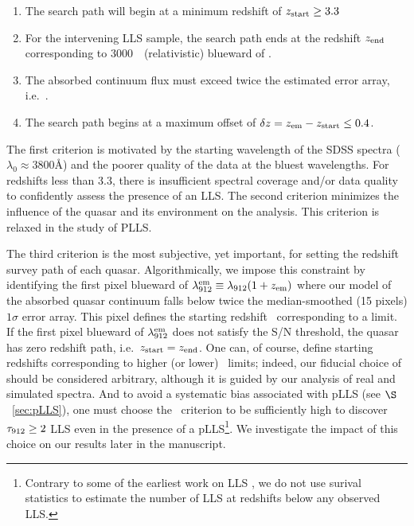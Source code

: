 \documentclass[12pt,preprint]{aastex}
\begin{document}
\begin{enumerate}
\item The search path will begin at a minimum redshift of
  $z_{\rm start} \ge 3.3$
\item For the intervening LLS sample, the search path ends at the redshift
  $z_{\rm end}$
  corresponding to 3000~\kms\ (relativistic) blueward of \zem.
\item The absorbed continuum flux must exceed twice the estimated error array, 
 i.e.\ \sna.
\item The search path begins at a maximum offset of 
   $\delta z = z_{\rm em} - z_{\rm start} \le 0.4$.
\end{enumerate}
The first criterion is motivated by the starting wavelength 
of the SDSS spectra ($\lambda_0 \approx 3800$\AA) and the
poorer quality of the data at the bluest wavelengths.
For redshifts less than 3.3, there is insufficient spectral
coverage and/or data quality to confidently assess the
presence of an LLS.  The second criterion minimizes
the influence of the quasar and its environment on
the analysis.  This criterion is relaxed in the study of PLLS. 


The third criterion is the most subjective, yet important,
for setting the redshift survey path of each quasar.
Algorithmically,  we impose this constraint by identifying
the first pixel blueward of $\lambda_{\rm 912}^{\rm em} \equiv \lambda_{\rm 912}(1+z_{\rm em})$
where our model of the absorbed quasar continuum falls
below twice the median-smoothed (15 pixels) $1\sigma$ error array. 
This pixel defines the starting redshift \zstrtt\ corresponding
to a  limit.  
If the first pixel blueward of $\lambda_{\rm 912}^{\rm em}$ does not satisfy
the S/N threshold, the quasar has zero redshift path, 
i.e.\ $z_{\rm start} = z_{\rm end}$.
One can, of course, define 
starting redshifts
corresponding to higher (or lower) \sna\ limits;  indeed, our
fiducial choice of  should be considered arbitrary, although 
it is guided by our analysis of real and simulated spectra.
And to avoid a systematic bias associated with pLLS (see $\S$~\ref{sec:pLLS}),
one must choose the \sna\ criterion to be sufficiently high
to discover $\tau_{\rm 912} \ge 2$ LLS even in the presence of a 
pLLS\footnote{Contrary to some of the earliest work 
on LLS \citep[e.g.][]{tytler84},
we do not use surival statistics to estimate the number of LLS
at redshifts below any observed LLS.}.
We investigate the impact of this choice on our results
later in the manuscript.
\end{document}
